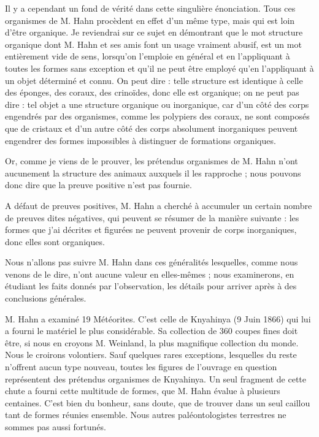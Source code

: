 \documentclass[a4paper, 12pt, oneside, french]{book}
\begin{document}
Il y a cependant un fond de vérité dans cette singulière énonciation. Tous ces organismes de M. Hahn procèdent en effet d'un même type, mais qui est loin d'être organique. Je reviendrai sur ce sujet en démontrant que le mot \og structure organique \fg dont M. Hahn et ses amis font un usage vraiment abusif, est un mot entièrement vide de sens, lorsqu'on l'emploie en général et en l'appliquant à toutes les formes sans exception et qu'il ne peut être employé qu'en l'appliquant à un objet déterminé et connu. On peut dire : telle structure est identique à celle des éponges, des coraux, des crinoïdes, donc elle est organique; on ne peut pas dire : tel objet a une structure organique ou inorganique, car d'un côté des corps engendrés par des organismes, comme les polypiers des coraux, ne sont composés que de cristaux et d'un autre côté des corps absolument inorganiques peuvent engendrer des formes impossibles à distinguer de formations organiques.

Or, comme je viens de le prouver, les prétendus organismes de M. Hahn n'ont aucunement la structure des animaux auxquels il les rapproche ; nous pouvons donc dire que la preuve positive n'est pas fournie.

A défaut de preuves positives, M. Hahn a cherché à accumuler un certain nombre de preuves dites négatives, qui peuvent se résumer de la manière suivante : les formes que j'ai décrites et figurées ne peuvent provenir de corps inorganiques, donc elles sont organiques.

Nous n'allons pas suivre M. Hahn dans ces généralités lesquelles, comme nous venons de le dire, n'ont aucune valeur en elles-mêmes ; nous examinerons, en étudiant les faits donnés par l'observation, les détails pour arriver après à des conclusions générales.

M. Hahn a examiné 19 Météorites. C'est celle de Knyahinya (9 Juin 1866) qui lui a fourni le matériel le plus considérable. Sa collection de 360 coupes fines doit être, si nous en croyons M. Weinland, la plus magnifique collection du monde. Nous le croirons volontiers. Sauf quelques rares exceptions, lesquelles du reste n'offrent aucun type nouveau, toutes les figures de l'ouvrage en question représentent des prétendus organismes de Knyahinya. Un seul fragment de cette chute a fourni cette multitude de formes, que M. Hahn évalue à plusieurs centaines. C'est bien du bonheur, sans doute, que de trouver dans un seul caillou tant de formes réunies ensemble. Nous autres paléontologistes terrestres ne sommes pas aussi fortunés.
\end{document}
